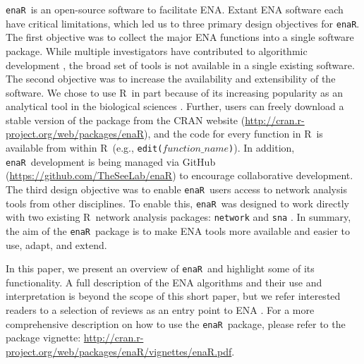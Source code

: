 \documentclass[11pt]{article}
\newcommand{\R}{R}
\newcommand{\enaR}{\texttt{enaR}}
\begin{document}
\begin{spacing}{2}
\enaR\ is an open-source software to facilitate ENA.  Extant ENA
software \citep{ulanowicz91, kazanci07, allesina04_wand,
  christensen04, fath06} each have critical limitations, which led us
to three primary design objectives for \enaR .
The first objective was to collect the major ENA functions into a
single software package.  While multiple investigators have
contributed to algorithmic development \citep[e.g.,][]{finn76,
  ulanowicz86, ulanowicz91, fath99_review, allesina03}, the broad set
of tools is not available in a single existing software.  The second
objective was to increase the availability and extensibility of the
software. We chose to use \R\ in part because of its
increasing popularity as an analytical tool in the biological sciences
\citep[e.g.,][]{dixon2003vegan, metcalf2012, revell2012phytools}.
Further, users can freely download a stable version of the package
from the CRAN website
(\url{http://cran.r-project.org/web/packages/enaR}), and the code for
every function in \R\ is available from within \R\ (e.g.,
\texttt{edit($function\_name$)}).  In addition, \enaR\ development is being managed
via GitHub (\url{https://github.com/TheSeeLab/enaR}) to encourage
collaborative development.  The third design objective was to enable
\enaR\ users access to network analysis tools from other
disciplines.  To enable this, \enaR\ was designed to work directly
with two existing \R\ network analysis packages:  \texttt{network}
\citep{butts08_network} and \texttt{sna} \citep{butts08_social}.  In
summary, the aim of the \enaR\ package is to make ENA tools more
available and easier to use, adapt, and extend.

In this paper, we present an overview of \enaR\ and highlight some of
its functionality.  A full description of the ENA algorithms and their
use and interpretation is beyond the scope of this short paper, but we
refer interested readers to a selection of reviews as an entry point
to ENA \citep{fath99_review, ulanowicz97, fath06, schramski11,
  jorgensen07_newecology}.  For a more comprehensive description on
how to use the \enaR\ package, please refer to the package vignette:
\url{http://cran.r-project.org/web/packages/enaR/vignettes/enaR.pdf}.


\end{spacing}
\end{document}
